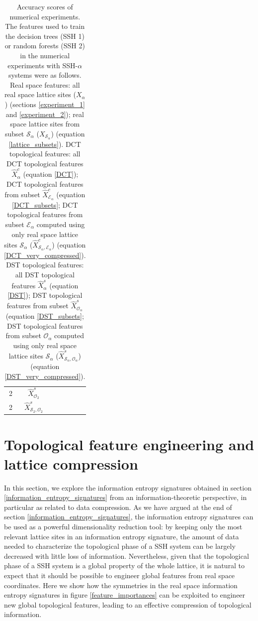 \documentclass[10pt]{revtex4-1}
\newcommand\accPrec{4}  %
\newcommand{\tableRow}[1]{\\[#1 cm]}
\newcommand\tableRowEnd{\tableRow{0.15}}
\newcommand\xsOTwo{$\hat{X}^s_{\mathcal{O}_2}$}
\newcommand\xsOTwoEigVal{\fpeval{round(0.9042001086956524,\accPrec)}}
\newcommand\xsOTwoEigTest{\fpeval{round(0.552662980209546,\accPrec)}}
\newcommand\xsOTwoHamVal{\fpeval{round(0.9917789855072465,\accPrec)}}
\newcommand\xsOTwoHamTest{\fpeval{round(0.7427124563445866,\accPrec)}}
\newcommand\xsSOTwo{$\hat{X}^s_{\mathcal{S}_2,\mathcal{O}_2}$}
\newcommand\xsSOTwoEigVal{\fpeval{round(0.8203919927536232,\accPrec)}}
\newcommand\xsSOTwoEigTest{\fpeval{round(0.41268987194412105,\accPrec)}}
\newcommand\xsSOTwoHamVal{\fpeval{round(0.9941884057971013,\accPrec)}}
\newcommand\xsSOTwoHamTest{\fpeval{round(0.5903026775320139,\accPrec)}}
\begin{document}
\begin{table}
\begin{tabular}{||c@{\hskip 0.3in} c@{\hskip 0.3in} c@{\hskip 0.3in} c@{\hskip 0.3in} c@{\hskip 0.3in} c||}
2                     &\xsOTwo           &\xsOTwoEigVal      &\xsOTwoEigTest     &\xsOTwoHamVal        &\xsOTwoHamTest     \tableRowEnd
2                     &\xsSOTwo          &\xsSOTwoEigVal     &\xsSOTwoEigTest    &\xsSOTwoHamVal       &\xsSOTwoHamTest    \tableRowEnd
\bottomrule
\end{tabular}
\caption{\label{accuracy_scores}Accuracy scores of numerical experiments. The features used to train the decision trees (SSH 1) or random forests (SSH 2) in the numerical experiments with SSH-$\alpha$ systems were as follows. Real space features: all real space lattice sites ($X_\alpha$) (sections \ref{experiment_1} and \ref{experiment_2}); real space lattice sites from subset $\mathcal{S}_{\alpha}$ ($X_{\mathcal{S}_{\alpha}}$) (equation \eqref{lattice_subsets}). DCT topological features: all DCT topological features $\hat{X}^c_\alpha$ (equation \eqref{DCT}); DCT topological features from subset $\hat{X}^c_{\mathcal{E}_\alpha}$ (equation \eqref{DCT_subsets}; DCT topological features from subset $\mathcal{E}_\alpha$ computed using only real space lattice sites $\mathcal{S}_{\alpha}$ ($\hat{X}^c_{\mathcal{S}_\alpha,\mathcal{E}_\alpha}$) (equation \eqref{DCT_very_compressed}). DST topological features: all DST topological features $\hat{X}^s_\alpha$ (equation \eqref{DST}); DST topological features from subset $\hat{X}^s_{\mathcal{O}_\alpha}$ (equation \eqref{DST_subsets}; DST topological features from subset $\mathcal{O}_\alpha$ computed using only real space lattice sites $\mathcal{S}_{\alpha}$ ($\hat{X}^s_{\mathcal{S}_\alpha,\mathcal{O}_\alpha}$) (equation \eqref{DST_very_compressed}). }
\end{table}




\section{Topological feature engineering and lattice compression}
\label{topological_feature_engineering}

In this section, we explore the information entropy signatures obtained in section \ref{information_entropy_signatures} from an information-theoretic perspective, in particular as related to data compression. As we have argued at the end of section \ref{information_entropy_signatures}, the information entropy signatures can be used as a powerful dimensionality reduction tool: by keeping only the most relevant lattice sites in an information entropy signature, the amount of data needed to characterize the topological phase of a SSH system can be largely decreased with little loss of information. Nevertheless, given that the topological phase of a SSH system is a global property of the whole lattice, it is natural to expect that it should be possible to engineer global features from real space coordinates. Here we show how the symmetries in the real space information entropy signatures in figure \ref{feature_importances} can be exploited to engineer new global topological features, leading to an effective compression of topological information.
\end{document}
